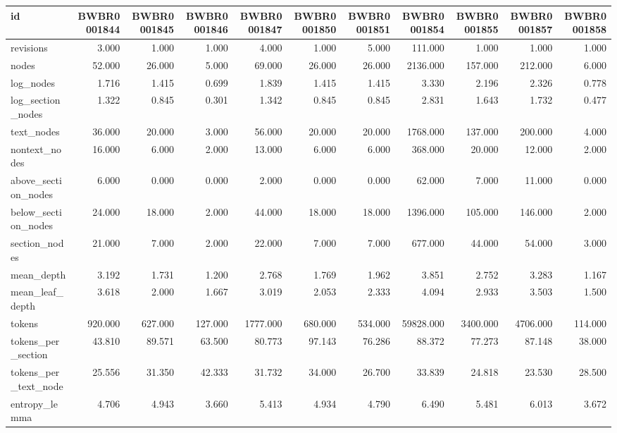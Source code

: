 \begin{tabular}{lrrrrrrrrrr}
\toprule
id & BWBR0001844 & BWBR0001845 & BWBR0001846 & BWBR0001847 & BWBR0001850 & BWBR0001851 & BWBR0001854 & BWBR0001855 & BWBR0001857 & BWBR0001858 \\
\midrule
revisions & 3.000 & 1.000 & 1.000 & 4.000 & 1.000 & 5.000 & 111.000 & 1.000 & 1.000 & 1.000 \\
\cline{1-11}
nodes & 52.000 & 26.000 & 5.000 & 69.000 & 26.000 & 26.000 & 2136.000 & 157.000 & 212.000 & 6.000 \\
\cline{1-11}
log\_nodes & 1.716 & 1.415 & 0.699 & 1.839 & 1.415 & 1.415 & 3.330 & 2.196 & 2.326 & 0.778 \\
\cline{1-11}
log\_section\_nodes & 1.322 & 0.845 & 0.301 & 1.342 & 0.845 & 0.845 & 2.831 & 1.643 & 1.732 & 0.477 \\
\cline{1-11}
text\_nodes & 36.000 & 20.000 & 3.000 & 56.000 & 20.000 & 20.000 & 1768.000 & 137.000 & 200.000 & 4.000 \\
\cline{1-11}
nontext\_nodes & 16.000 & 6.000 & 2.000 & 13.000 & 6.000 & 6.000 & 368.000 & 20.000 & 12.000 & 2.000 \\
\cline{1-11}
above\_section\_nodes & 6.000 & 0.000 & 0.000 & 2.000 & 0.000 & 0.000 & 62.000 & 7.000 & 11.000 & 0.000 \\
\cline{1-11}
below\_section\_nodes & 24.000 & 18.000 & 2.000 & 44.000 & 18.000 & 18.000 & 1396.000 & 105.000 & 146.000 & 2.000 \\
\cline{1-11}
section\_nodes & 21.000 & 7.000 & 2.000 & 22.000 & 7.000 & 7.000 & 677.000 & 44.000 & 54.000 & 3.000 \\
\cline{1-11}
mean\_depth & 3.192 & 1.731 & 1.200 & 2.768 & 1.769 & 1.962 & 3.851 & 2.752 & 3.283 & 1.167 \\
\cline{1-11}
mean\_leaf\_depth & 3.618 & 2.000 & 1.667 & 3.019 & 2.053 & 2.333 & 4.094 & 2.933 & 3.503 & 1.500 \\
\cline{1-11}
tokens & 920.000 & 627.000 & 127.000 & 1777.000 & 680.000 & 534.000 & 59828.000 & 3400.000 & 4706.000 & 114.000 \\
\cline{1-11}
tokens\_per\_section & 43.810 & 89.571 & 63.500 & 80.773 & 97.143 & 76.286 & 88.372 & 77.273 & 87.148 & 38.000 \\
\cline{1-11}
tokens\_per\_text\_node & 25.556 & 31.350 & 42.333 & 31.732 & 34.000 & 26.700 & 33.839 & 24.818 & 23.530 & 28.500 \\
\cline{1-11}
entropy\_lemma & 4.706 & 4.943 & 3.660 & 5.413 & 4.934 & 4.790 & 6.490 & 5.481 & 6.013 & 3.672 \\

\end{tabular}
